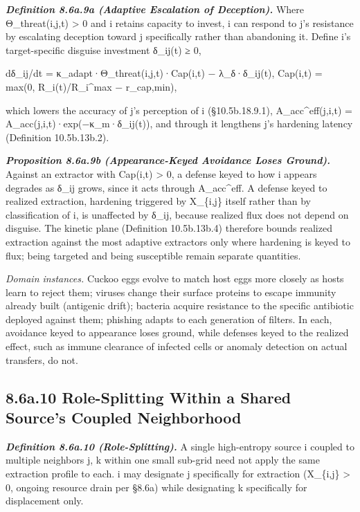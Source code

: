 \documentclass[
]{article}
\begin{document}
\emph{\textbf{Definition 8.6a.9a (Adaptive Escalation of Deception).}}
Where Θ\_threat(i,j,t) \textgreater{} 0 and i retains capacity to
invest, i can respond to j's resistance by escalating deception toward j
specifically rather than abandoning it. Define i's target-specific
disguise investment δ\_ij(t) ≥ 0,

dδ\_ij/dt = κ\_adapt·Θ\_threat(i,j,t)·Cap(i,t) − λ\_δ·δ\_ij(t), Cap(i,t)
= max(0, R\_i(t)/R\_i\^{}max − r\_cap,min),

which lowers the accuracy of j's perception of i (§10.5b.18.9.1),
A\_acc\^{}eff(j,i,t) = A\_acc(j,i,t)·exp(−κ\_m·δ\_ij(t)), and through it
lengthens j's hardening latency (Definition 10.5b.13b.2).

\emph{\textbf{Proposition 8.6a.9b (Appearance-Keyed Avoidance Loses
Ground).}} Against an extractor with Cap(i,t) \textgreater{} 0, a
defense keyed to how i appears degrades as δ\_ij grows, since it acts
through A\_acc\^{}eff. A defense keyed to realized extraction, hardening
triggered by X\_\{i,j\} itself rather than by classification of i, is
unaffected by δ\_ij, because realized flux does not depend on disguise.
The kinetic plane (Definition 10.5b.13b.4) therefore bounds realized
extraction against the most adaptive extractors only where hardening is
keyed to flux; being targeted and being susceptible remain separate
quantities.

\emph{Domain instances.} Cuckoo eggs evolve to match host eggs more
closely as hosts learn to reject them; viruses change their surface
proteins to escape immunity already built (antigenic drift); bacteria
acquire resistance to the specific antibiotic deployed against them;
phishing adapts to each generation of filters. In each, avoidance keyed
to appearance loses ground, while defenses keyed to the realized effect,
such as immune clearance of infected cells or anomaly detection on
actual transfers, do not.

\hypertarget{a.10-role-splitting-within-a-shared-sources-coupled-neighborhood}{%
\subsection{8.6a.10 Role-Splitting Within a Shared Source's Coupled
Neighborhood}\label{a.10-role-splitting-within-a-shared-sources-coupled-neighborhood}}

\emph{\textbf{Definition 8.6a.10 (Role-Splitting).}} A single
high-entropy source i coupled to multiple neighbors j, k within one
small sub-grid need not apply the same extraction profile to each. i may
designate j specifically for extraction (X\_\{i,j\} \textgreater{} 0,
ongoing resource drain per §8.6a) while designating k specifically for
displacement only.
\end{document}
